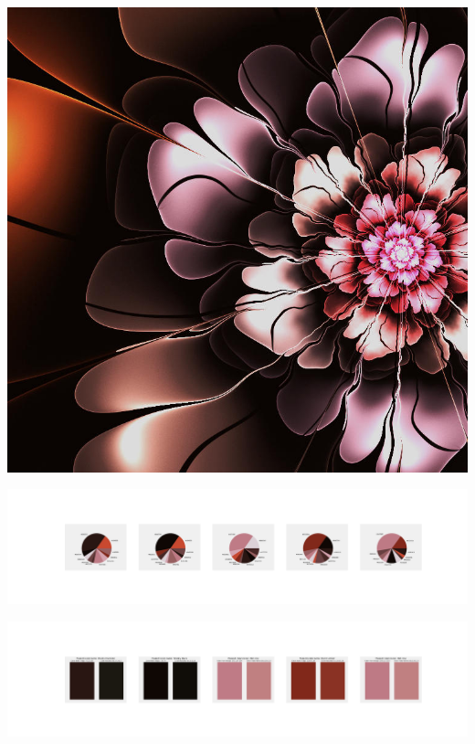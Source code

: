 \documentclass[11pt]{article}
\begin{document}
\begin{landscape}
    \begin{center}
    \includegraphics[width=\textwidth]{./nbimg/file (94).jpg}
    \end{center}

    \begin{center}
    \includegraphics[width=250mm]{./nbimg/pie-445.jpg}
    \end{center}

    \begin{center}
    \includegraphics[width=250mm]{./nbimg/peak-445.jpg}
    \end{center}
    


\end{landscape}
\end{document}
